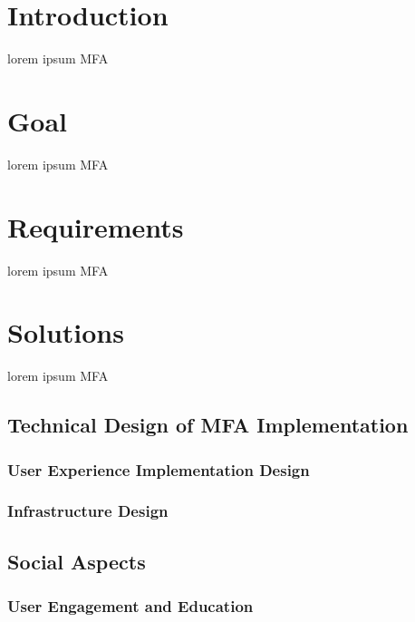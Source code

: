 \documentclass[sigconf,review]{acmart}
\begin{document}
\section{Introduction}
\label{intro}

lorem ipsum MFA

\section{Goal}
\label{goal}

lorem ipsum MFA

\section{Requirements}
\label{reqs}

lorem ipsum MFA \cite{xie2013fast, diffie1977special}

\section{Solutions}
\label{solns}

lorem ipsum MFA \cite{m2011totp, habets2011, redhat2019}

\subsection{Technical Design of MFA Implementation}
\label{design}

\subsubsection{User Experience Implementation Design}
\label{user}

\subsubsection{Infrastructure Design}
\label{infra}

\subsection{Social Aspects}
\label{social}

\subsubsection{User Engagement and Education}
\label{engage}
\end{document}
